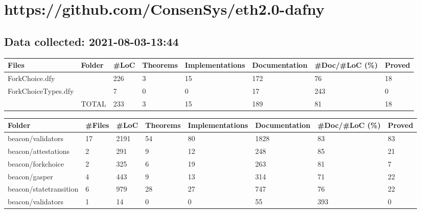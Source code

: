 \documentclass[a4paper, 12pt]{article}
\begin{document}
\section*{https://github.com/ConsenSys/eth2.0-dafny}
\subsection*{Data collected: 2021-08-03-13:44}
\scriptsize
\begin{tabular}{llllllll}
\toprule
               Files & Folder & \#LoC & Theorems & Implementations & Documentation & \#Doc/\#LoC (\%) & Proved \\
\midrule
      ForkChoice.dfy &        &  226 &        3 &              15 &           172 &            76 &     18 \\
 ForkChoiceTypes.dfy &        &    7 &        0 &               0 &            17 &           243 &      0 \\
                     &  TOTAL &  233 &        3 &              15 &           189 &            81 &     18 \\
\bottomrule
\end{tabular}

\vspace{2em}
\begin{tabular}{llllllll}
\toprule
                 Folder & \#Files &  \#LoC & Theorems & Implementations & Documentation & \#Doc/\#LoC (\%) & Proved \\
\midrule
      beacon/validators &     17 &  2191 &       54 &              80 &          1828 &            83 &     83 \\
    beacon/attestations &      2 &   291 &        9 &              12 &           248 &            85 &     21 \\
      beacon/forkchoice &      2 &   325 &        6 &              19 &           263 &            81 &      7 \\
          beacon/gasper &      4 &   443 &        9 &              13 &           314 &            71 &     22 \\
 beacon/statetransition &      6 &   979 &       28 &              27 &           747 &            76 &     22 \\
      beacon/validators &      1 &    14 &        0 &               0 &            55 &           393 &      0 \\
\bottomrule
\end{tabular}
\end{document}
